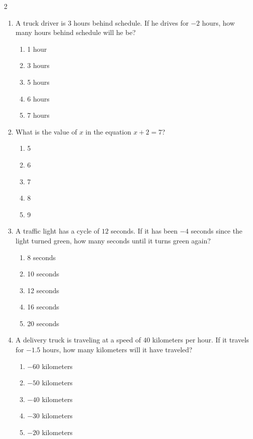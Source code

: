 \documentclass[10pt]{article}
\begin{document}
\begin{multicols}{2}
\begin{enumerate}[label=\textbf{Q\arabic*.}, leftmargin=*, itemsep=6pt, parsep=0pt]
  \item \small A truck driver is $3$ hours behind schedule. If he drives for $-2$ hours, how many hours behind schedule will he be?
  \begin{enumerate}[label=(\Alph*), leftmargin=0.6cm, nosep, itemsep=2pt]
    \item 1 hour
    \item 3 hours
    \item 5 hours
    \item 6 hours
    \item 7 hours
  \end{enumerate}

  \item \small What is the value of $x$ in the equation $x + 2 = 7$?
  \begin{enumerate}[label=(\Alph*), leftmargin=0.6cm, nosep, itemsep=2pt]
    \item 5
    \item 6
    \item 7
    \item 8
    \item 9
  \end{enumerate}

  \item \small A traffic light has a cycle of $12$ seconds. If it has been $-4$ seconds since the light turned green, how many seconds until it turns green again?
  \begin{enumerate}[label=(\Alph*), leftmargin=0.6cm, nosep, itemsep=2pt]
    \item 8 seconds
    \item 10 seconds
    \item 12 seconds
    \item 16 seconds
    \item 20 seconds
  \end{enumerate}

  \item \small A delivery truck is traveling at a speed of $40$ kilometers per hour. If it travels for $-1.5$ hours, how many kilometers will it have traveled?
  \begin{enumerate}[label=(\Alph*), leftmargin=0.6cm, nosep, itemsep=2pt]
    \item $-60$ kilometers
    \item $-50$ kilometers
    \item $-40$ kilometers
    \item $-30$ kilometers
    \item $-20$ kilometers
  \end{enumerate}


\end{enumerate}
\end{multicols}
\end{document}
